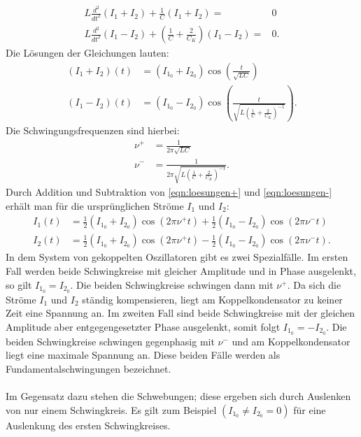 \begin{align}
 L\frac{d^2}{dt^2}(I_1+I_2) + \frac{1}{C}(I_1+I_2)=&0\\
 L\frac{d^2}{dt^2}(I_1-I_2) + \left(\frac{1}{C} + \frac{2}{C_K} \right)(I_1-I_2)=&0.
\end{align}
 Die Lösungen der Gleichungen lauten:\\
 \begin{align}
   (I_1+I_2)(t)&=(I_{1_0}+I_{2_0})\cos\left(\frac{t}{\sqrt{LC}}\right) \label{eqn:loesungen+}\\
   (I_1-I_2)(t)&=(I_{1_0}-I_{2_0})\cos\left(\frac{t}{\sqrt{L\left(\frac{1}{C}+\frac{2}{C_K}\right)^{-1}}}\right) \label{eqn:loesungen-}.
 \end{align}
 Die Schwingungsfrequenzen sind hierbei:
 \begin{align}
   \nu^{+}&=\frac{1}{2\pi\sqrt{LC}} \label{eqn:Frequenz1}\\
   \nu^{-}&=\frac{1}{2\pi\sqrt{L\left(\frac{1}{C}+\frac{2}{C_K}\right)^{-1}}}\label{eqn:Frequenz2}.
 \end{align}
Durch Addition und Subtraktion von \eqref{eqn:loesungen+} und \eqref{eqn:loesungen-}  erhält man für die ursprünglichen Ströme $I_1$ und $I_2$:\\
 \begin{align}
   I_1(t)&=\frac{1}{2}(I_{1_0}+I_{2_0})\cos(2\pi\nu^{+}t)+\frac{1}{2}(I_{1_0}-I_{2_0})\cos(2\pi\nu^{-}t)\label{eqn:strom1}\\
   I_2(t)&=\frac{1}{2}(I_{1_0}+I_{2_0})\cos(2\pi\nu^{+}t)-\frac{1}{2}(I_{1_0}-I_{2_0})\cos(2\pi\nu^{-}t)\label{eqn:strom2}.
 \end{align}
 In dem System von gekoppelten Oszillatoren gibt es zwei Spezialfälle.
 Im ersten Fall werden beide Schwingkreise mit gleicher Amplitude und in Phase ausgelenkt, so gilt $I_{1_0}=I_{2_0}$.
 Die beiden Schwingkreise schwingen dann mit $\nu^{+} $.
 Da sich die Ströme $I_1$ und $I_2$ ständig kompensieren, liegt am Koppelkondensator zu keiner Zeit eine Spannung an.
 Im zweiten Fall sind beide Schwingkreise mit der gleichen Amplitude aber entgegengesetzter Phase ausgelenkt, somit folgt $I_{1_0}=-I_{2_0}$.
 Die beiden Schwingkreise schwingen gegenphasig mit $\nu^{-}$ und am Koppelkondensator liegt eine maximale Spannung an.
 Diese beiden Fälle werden als Fundamentalschwingungen bezeichnet.\\
 \\
 Im Gegensatz dazu stehen die Schwebungen; diese ergeben sich durch Auslenken von nur einem Schwingkreis.
 Es gilt zum Beispiel $(I_{1_0}\neq I_{2_0}=0)$ für eine Auslenkung des ersten Schwingkreises.
